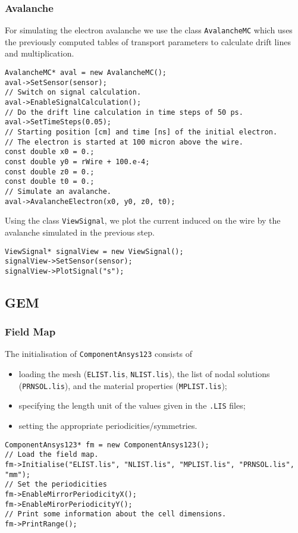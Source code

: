 \subsubsection{Avalanche}
For simulating the electron avalanche we use the class \texttt{AvalancheMC} 
which uses the previously computed tables of transport parameters to 
calculate drift lines and multiplication. 
\begin{lstlisting}
AvalancheMC* aval = new AvalancheMC();
aval->SetSensor(sensor);
// Switch on signal calculation.
aval->EnableSignalCalculation();
// Do the drift line calculation in time steps of 50 ps.
aval->SetTimeSteps(0.05);
// Starting position [cm] and time [ns] of the initial electron.
// The electron is started at 100 micron above the wire.
const double x0 = 0.;
const double y0 = rWire + 100.e-4;
const double z0 = 0.;
const double t0 = 0.;
// Simulate an avalanche.
aval->AvalancheElectron(x0, y0, z0, t0);
\end{lstlisting}

Using the class \texttt{ViewSignal}, we plot the current induced on 
the wire by the avalanche simulated in the previous step.
\begin{lstlisting}
ViewSignal* signalView = new ViewSignal();
signalView->SetSensor(sensor);
signalView->PlotSignal("s");
\end{lstlisting}

\subsection{GEM}\label{Sec:ExampleGem}

\subsubsection{Field Map}

The initialisation of \texttt{ComponentAnsys123} consists of 
\begin{itemize}
  \item
  loading the mesh (\texttt{ELIST.lis}, \texttt{NLIST.lis}), 
  the list of nodal solutions (\texttt{PRNSOL.lis}), and the 
  material properties (\texttt{MPLIST.lis});
  \item
  specifying the length unit of the values given in the 
  \texttt{.LIS} files;
  \item
  setting the appropriate periodicities/symmetries.
\end{itemize}
\begin{lstlisting}
ComponentAnsys123* fm = new ComponentAnsys123();
// Load the field map.
fm->Initialise("ELIST.lis", "NLIST.lis", "MPLIST.lis", "PRNSOL.lis", "mm");
// Set the periodicities
fm->EnableMirrorPeriodicityX();
fm->EnableMirorPeriodicityY();
// Print some information about the cell dimensions.
fm->PrintRange();
\end{lstlisting}

